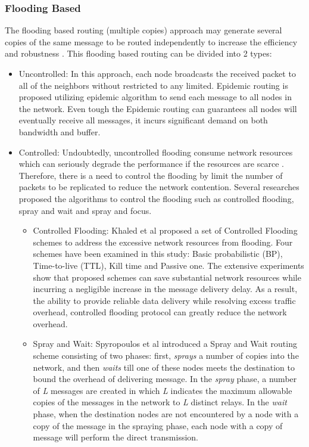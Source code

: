 \subsubsection{Flooding Based}
\label{bg:Opportunistic Networks:Classification of Opportunistic Routing:FB}
The flooding based routing (multiple copies) approach may generate several copies of the same message to be routed independently to increase the efficiency and robustness \cite{Chung-Ming2008}.  
This flooding based routing can be divided into 2 types:
\begin{itemize}
	\item Uncontrolled:
	In this approach, each node broadcasts the received packet to all of the neighbors without restricted to any limited. 
	Epidemic routing \cite{Vahdat2000} is proposed utilizing epidemic algorithm to send each message to all nodes in the network.
	Even tough the Epidemic routing can guarantees all nodes will eventually receive all messages, it incurs significant demand on both bandwidth and buffer.
	\item Controlled:
	Undoubtedly, uncontrolled flooding consume network resources which can seriously degrade the performance if the resources are scarce \cite{Tonguz2006}.
	Therefore, there is a need to control the flooding by limit the number of packets to be replicated to reduce the network contention.
	Several researches proposed the algorithms to control the flooding such as controlled flooding, spray and wait and spray and focus.
	\begin{itemize}
		
		\item Controlled Flooding: 
		Khaled et al \cite{Khaled2009} proposed a set of Controlled Flooding schemes to address the excessive network resources from flooding. 
		Four schemes have been examined in this study: Basic probabilistic (BP), Time-to-live (TTL), Kill time and Passive one.
		The extensive experiments show that proposed schemes can save substantial network resources while incurring a negligible increase in the message delivery delay.
		As a result, the ability to provide reliable data delivery while resolving excess traffic overhead, controlled flooding protocol can greatly reduce the network overhead.
		
		\item Spray and Wait:
		Spyropoulos et al \cite{Spyropoulos2005} introduced a Spray and Wait routing scheme consisting of two phases: first, \emph{sprays} a number of copies into the network, and then \emph{waits} till one of these nodes meets the destination to bound the overhead of delivering message.
		In the \emph{spray} phase, a number of \emph{L} messages are created in which \emph{L} indicates the maximum allowable copies of the messages in the network to \emph{L} distinct relays.
		In the \emph{wait} phase, when the destination nodes are not encountered by a node with a copy of the message in the spraying phase, each node with a copy of message will perform the direct transmission.
		

\end{itemize}
\end{itemize}
